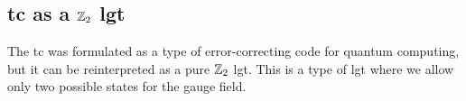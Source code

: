 %
%
%


%
%
\subsection{\ac{tc} as a \texorpdfstring{$\mathbb{Z}_2$}{Z2} \ac{lgt}}
\label{sub:toric_code_as_a_z2_lattice_gauge_theory}

The \ac{tc} was formulated as a type of error-correcting code for quantum computing, but it can be reinterpreted as a pure $\mathbb{Z}_2$ \ac{lgt}.
This is a type of \ac{lgt} where we allow only two possible states for the gauge field.

